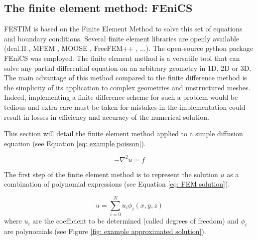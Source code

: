 \subsection{The finite element method: FEniCS}
FESTIM is based on the Finite Element Method to solve this set of equations and boundary conditions.
Several finite element libraries are openly available (deal.II , MFEM , MOOSE , FreeFEM++ , ...).
The open-source python package FEniCS  was employed.
The finite element method is a versatile tool that can solve any partial differential equation on an arbitrary geometry in 1D, 2D or 3D.
The main advantage of this method compared to the finite difference method is the simplicity of its application to complex geometries and unstructured meshes.
Indeed, implementing a finite difference scheme for such a problem would be tedious and extra care must be taken for mistakes in the implementation could result in losses in efficiency and accuracy of the numerical solution.

This section will detail the finite element method applied to a simple diffusion equation (see Equation \ref{eq: example poisson}).

\begin{equation}
    -\nabla^2 u = f
    \label{eq: example poisson}
\end{equation}

The first step of the finite element method is to represent the solution $u$ as a combination of polynomial expressions (see Equation \ref{eq: FEM solution}).

\begin{equation}
    u = \sum^N_{i=0}u_i \phi_i(x, y, z)
    \label{eq: FEM solution}
\end{equation}
where $u_i$ are the coefficient to be determined (called degrees of freedom) and $\phi_i$ are polynomials (see Figure \ref{fig: example approximated solution}).

